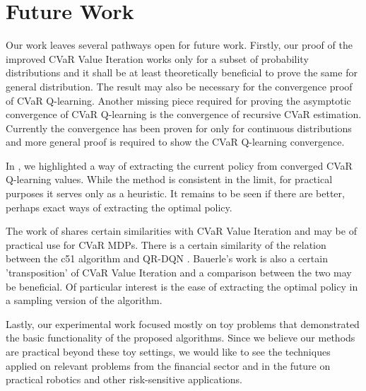 
\section{Future Work}

Our work leaves several pathways open for future work. Firstly, our proof of the improved CVaR Value Iteration works only for a subset of probability distributions and it shall be at least theoretically beneficial to prove the same for general distribution. The result may also be necessary for the convergence proof of CVaR Q-learning. Another missing piece required for proving the asymptotic convergence of CVaR Q-learning is the convergence of recursive CVaR estimation. Currently the convergence has been proven for only for continuous distributions and more general proof is required to show the CVaR Q-learning convergence.

In , we highlighted a way of extracting the current policy from converged CVaR Q-learning values. While the method is consistent in the limit, for practical purposes it serves only as a heuristic. It remains to be seen if there are better, perhaps exact ways of extracting the optimal policy.

The work of \citet{bauerle2011markov} shares certain similarities with CVaR Value Iteration and may be of practical use for CVaR MDPs. There is a certain similarity of the relation between the c51 algorithm \citep{bellemare2017distributional} and QR-DQN \citep{dabney2017distributional}. Bauerle's work is also a certain 'transposition' of CVaR Value Iteration and a comparison between the two may be beneficial. Of particular interest is the ease of extracting the optimal policy in a sampling version of the algorithm.

Lastly, our experimental work focused mostly on toy problems that demonstrated the basic functionality of the proposed algorithms. Since we believe our methods are practical beyond these toy settings, we would like to see the techniques applied on relevant problems from the financial sector and in the future on practical robotics and other risk-sensitive applications.


